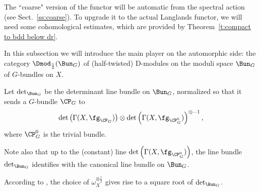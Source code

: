 \documentclass[9pt]{amsart}
\theoremstyle{remark}
\theoremstyle{definition}
\theoremstyle{remark}
\newcommand{\thmref}[1]{Theorem~\ref{#1}}
\newcommand{\secref}[1]{Sect.~\ref{#1}}
\numberwithin{equation}{section}
\begin{document}
The ``coarse" version of the functor will be automatic from the spectral action (see \secref{ss:coarse}). 
To upgrade it to the actual Langlands functor, we will need some cohomological estimates, which are
provided by \thmref{t:compact to bdd below dr}. 

 \label{ss:autom}

In this subsection we will introduce the main player on the automorphic side: the category $\Dmod_{\frac{1}{2}}(\Bun_G)$
of (half-twisted) D-modules on the moduli space $\Bun_G$ of $G$-bundles on $X$. 

\sssec{} \label{sss:crit 1/2 can}

Let $\det_{\Bun_G}$ be the determinant line bundle on $\Bun_G$, normalized so that it sends a $G$-bundle $\CP_G$ 
to 
$$\det\left(\Gamma(X,\fg_{\CP_G})\right) \otimes \det\left(\Gamma(X,\fg_{\CP^0_G})\right)^{\otimes -1},$$
where $\CP^0_G$ is the trivial bundle.

\medskip

Note also that up to the (constant) line $\det\left(\Gamma(X,\fg_{\CP^0_G})\right)$, the line bundle $\det_{\Bun_G}$
identifies with the canonical line bundle on $\Bun_G$.

\sssec{} \label{sss:pfaff}

According to \cite[Sect. 4]{BD}, the choice of $\omega^{\otimes \frac{1}{2}}_X$ gives rise to a square root of $\det_{\Bun_G}$.

%
%
%
%
%
%
%
%
%
%
%
%
%
%
%
\end{document}
